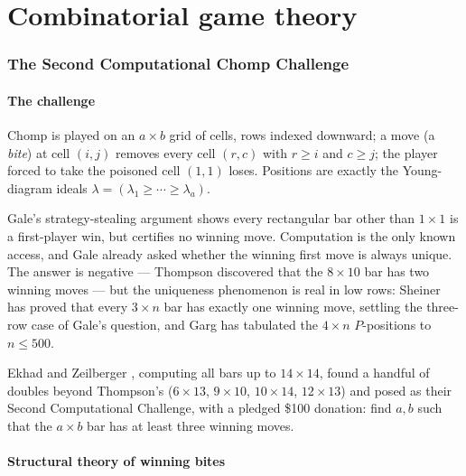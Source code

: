 \documentclass[11pt]{article}
\theoremstyle{definition}
\begin{document}
\part{Combinatorial game theory}

\section{The Second Computational Chomp Challenge}\label{sec:chomp}

\subsection{The challenge}

Chomp is played on an $a\times b$ grid of cells, rows indexed downward; a move
(a \emph{bite}) at cell $(i,j)$ removes every cell $(r,c)$ with $r\ge i$ and
$c\ge j$; the player forced to take the poisoned cell $(1,1)$ loses. Positions
are exactly the Young-diagram ideals $\lambda=(\lambda_1\ge\cdots\ge\lambda_a)$.

Gale's strategy-stealing argument \cite{Gale} shows every rectangular bar other
than $1\times1$ is a first-player win, but certifies no winning move.
Computation is the only known access, and Gale already asked whether the
winning first move is always unique. The answer is negative --- Thompson
discovered that the $8\times10$ bar has two winning moves \cite{BHMS} --- but
the uniqueness phenomenon is real in low rows: Sheiner \cite{Sheiner} has
proved that every $3\times n$ bar has exactly one winning move, settling the
three-row case of Gale's question, and Garg \cite{Garg} has tabulated the
$4\times n$ $P$-positions to $n\le500$.

Ekhad and Zeilberger \cite{EZ}, computing all bars up to $14\times14$, found a
handful of doubles beyond Thompson's ($6\times13$, $9\times10$, $10\times14$,
$12\times13$) and posed as their Second Computational Challenge, with a pledged
\$100 donation: find $a,b$ such that the $a\times b$ bar has at least three
winning moves.

\begin{center}
\end{center}

\subsection{Structural theory of winning bites}
\end{document}
